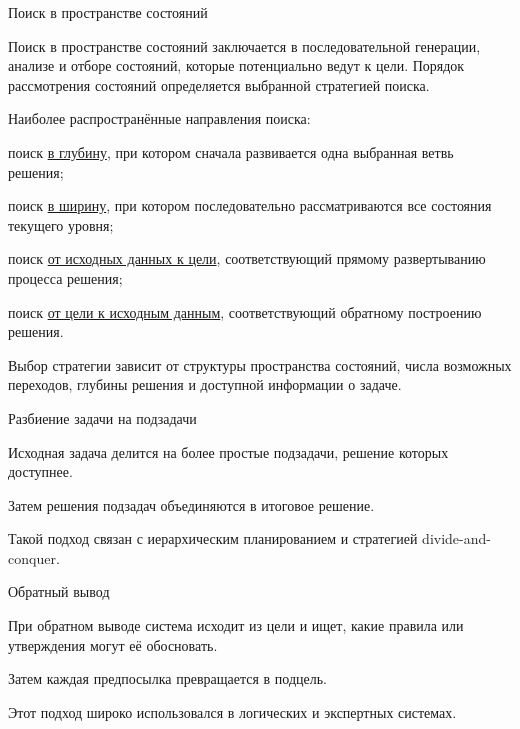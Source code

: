 \begin{frame}{Поиск в пространстве состояний}
	\topline
	\justifying
	
	\footnotesize
	\vspace{10mm}
	
	Поиск в пространстве состояний заключается в последовательной генерации, анализе и отборе состояний, которые потенциально ведут к цели. Порядок рассмотрения состояний определяется выбранной стратегией поиска.
	
	\vspace{2mm}
	
	Наиболее распространённые направления поиска:
	\begin{textitemize}
		\item поиск \uline{в глубину}, при котором сначала развивается одна выбранная ветвь решения;
		\item поиск \uline{в ширину}, при котором последовательно рассматриваются все состояния текущего уровня;
		\item поиск \uline{от исходных данных к цели}, соответствующий прямому развертыванию процесса решения;
		\item поиск \uline{от цели к исходным данным}, соответствующий обратному построению решения.
	\end{textitemize}
	
	\vspace{2mm}
	
	Выбор стратегии зависит от структуры пространства состояний, числа возможных переходов, глубины решения и доступной информации о задаче.
\end{frame}

\begin{frame}{Разбиение задачи на подзадачи}
	\topline
	\justifying
	
	\begin{textitemize}
		\item Исходная задача делится на более простые подзадачи, решение которых доступнее.
		\item Затем решения подзадач объединяются в итоговое решение.
		\item Такой подход связан с иерархическим планированием и стратегией divide-and-conquer.
	\end{textitemize}
\end{frame}

\begin{frame}{Обратный вывод}
	\topline
	\justifying
	
	\begin{textitemize}
		\item При обратном выводе система исходит из цели и ищет, какие правила или утверждения могут её обосновать.
		\item Затем каждая предпосылка превращается в подцель.
		\item Этот подход широко использовался в логических и экспертных системах.
	\end{textitemize}
\end{frame}

